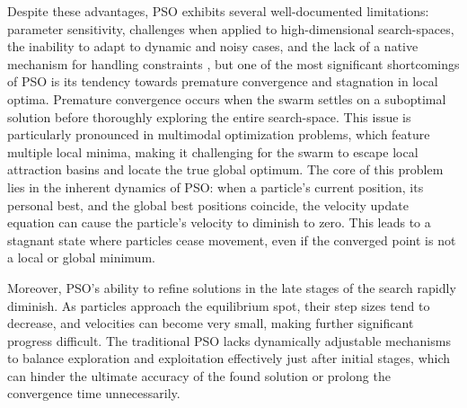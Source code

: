 {Despite these advantages, PSO exhibits several well-documented limitations: 
parameter sensitivity,
challenges when applied to high-dimensional \glspl{search-space},
the inability to adapt to dynamic and noisy cases,
and the lack of a native mechanism for handling constraints
\citep[see,][]{abualigah2025particle},
but
one of the most significant shortcomings of PSO is its tendency towards premature convergence and stagnation in local optima. Premature convergence occurs when the swarm settles on a suboptimal solution before thoroughly exploring the entire \gls{search-space}. This issue is particularly pronounced in multimodal optimization problems, which feature multiple local minima, making it challenging for the swarm to escape local attraction basins and locate the true global optimum. The core of this problem lies in the inherent dynamics of PSO: when a particle's current position, its personal best, and the global best positions coincide, the velocity update equation can cause the particle's velocity to diminish to zero. This leads to a stagnant state where particles cease movement, even if the converged point is not a local or global minimum.

Moreover, PSO's ability to refine solutions in the late stages of the search rapidly diminish. As particles approach the equilibrium spot, their step sizes tend to decrease, and velocities can become very small, making further significant progress difficult. The traditional PSO lacks dynamically adjustable mechanisms to balance exploration and exploitation effectively just after initial stages, which can hinder the ultimate accuracy of the found solution or prolong the convergence time unnecessarily.



}
